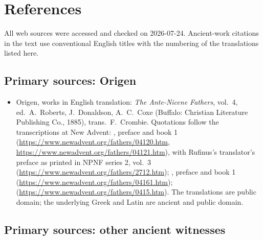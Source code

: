 \section{References}

\begingroup
\raggedright

All web sources were accessed and checked on 2026-07-24. Ancient-work
citations in the text use conventional English titles with the numbering of
the translations listed here.

\subsection*{Primary sources: Origen}

\begin{itemize}
\item Origen, works in English translation: \textit{The Ante-Nicene
Fathers}, vol.~4, ed.\ A.~Roberts, J.~Donaldson, A.~C.~Coxe (Buffalo:
Christian Literature Publishing Co., 1885), trans.\ F.~Crombie. Quotations
follow the transcriptions at New Advent: ,
preface and book 1
(\url{https://www.newadvent.org/fathers/04120.htm},
\url{https://www.newadvent.org/fathers/04121.htm}), with Rufinus's
translator's preface as printed in NPNF series 2, vol.~3
(\url{https://www.newadvent.org/fathers/2712.htm}); ,
preface and book 1 (\url{https://www.newadvent.org/fathers/04161.htm});
(\url{https://www.newadvent.org/fathers/0415.htm}). The translations are
public domain; the underlying Greek and Latin are ancient and public
domain.
\end{itemize}

\subsection*{Primary sources: other ancient witnesses}

